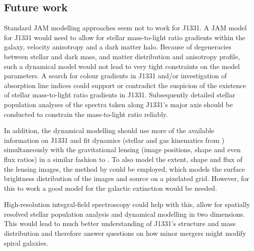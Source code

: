 \subsection{Future work}

Standard JAM modelling approaches seem not to work for J1331. A JAM model for J1331 would need to allow for stellar mass-to-light ratio gradients within the galaxy, velocity anisotropy and a dark matter halo. Because of degeneracies between stellar and dark mass, and matter distribution and anisotropy profile, such a dynamical model would not lead to very tight constraints on the model parameters.  A search for colour gradients in J1331 and/or investigation of absorption line indices could support or contradict the suspicion of the existence of stellar mass-to-light ratio gradients in J1331. Subsequently detailed stellar population analyses of the spectra taken along J1331's major axis should be conducted to constrain the mass-to-light ratio reliably.  

In addition, the dynamical modelling should use more of the available information on J1331 and fit dynamics (stellar and gas kinematics from \citet{SWELLSV}) simultaneously with the gravitational lensing (image positions, shape and even flux ratios) in a similar fashion to \citet{SWELLSIV}. To also model the extent, shape and flux of the lensing images, the method by \citet{2004ApJ...611..739T,2003ApJ...590..673W} could be employed, which models the surface brightness distribution of the images and source on a pixelated grid. However, for this to work a good model for the galactic extinction would be needed. 

High-resolution integral-field spectroscopy could help with this, allow for spatially resolved stellar population analysis and dynamical modelling in two dimensions.  This would lead to much better understanding of J1331's structure and mass distribution and therefore answer questions on how minor mergers might modify spiral galaxies.




